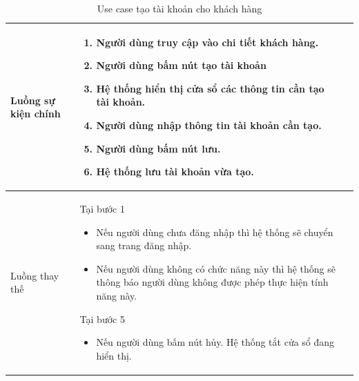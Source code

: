 \documentclass[12pt,a4paper]{article}
\begin{document}
\begin{table}[H]
\begin{tabular}{|p{3.5cm}|p{11.5cm}|c|}
            Luồng sự kiện chính & \vspace{-.8cm}\begin{enumerate}
                                                    \item Người dùng truy cập vào chi tiết khách hàng.
                                                    \item Người dùng bấm nút tạo tài khoản
                                                    \item Hệ thống hiển thị cửa sổ các thông tin cần tạo tài khoản.
                                                    \item Người dùng nhập thông tin tài khoản cần tạo.
                                                    \item Người dùng bấm nút lưu.
                                                    \item Hệ thống lưu tài khoản vừa tạo.
            \end{enumerate}
            \\
            \hline
            Luồng thay thế & Tại bước 1\newline
            \vspace{-.8cm}\begin{itemize}
                              \item Nếu người dùng chưa đăng nhập thì hệ thống sẽ chuyển sang trang đăng nhập.
                              \item Nếu người dùng không có chức năng này thì hệ thống sẽ thông báo người dùng không được phép thực hiện tính năng này.
            \end{itemize}
            Tại bước 5\newline
            \vspace{-.8cm}\begin{itemize}
                              \item Nếu người dùng bấm nút hủy. Hệ thống tắt cửa sổ đang hiển thị.
            \end{itemize}
            \\ \hline
        \end{tabular}
        \caption{Use case tạo tài khoản cho khách hàng}
    \end{table}

\end{document}
